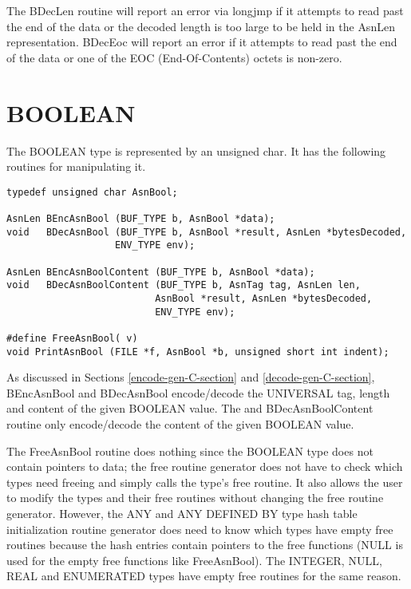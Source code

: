 The {\C BDecLen} routine will report an error via {\C longjmp} if
it attempts to read past the end of the data or the decoded length is
too large to be held in the {\C AsnLen} representation.
{\C BDecEoc} will report an error if it attempts to read past the
end of the data or one of the EOC (End-Of-Contents) octets is
non-zero.

\section{\label{bool-C-section}BOOLEAN}

The BOOLEAN type is represented by an {\C unsigned char}.  It has
the following routines for manipulating it.
\begin{small}
\begin{verbatim}
typedef unsigned char AsnBool;

AsnLen BEncAsnBool (BUF_TYPE b, AsnBool *data);
void   BDecAsnBool (BUF_TYPE b, AsnBool *result, AsnLen *bytesDecoded,
                   ENV_TYPE env);

AsnLen BEncAsnBoolContent (BUF_TYPE b, AsnBool *data);
void   BDecAsnBoolContent (BUF_TYPE b, AsnTag tag, AsnLen len,
                          AsnBool *result, AsnLen *bytesDecoded,
                          ENV_TYPE env);

#define FreeAsnBool( v)
void PrintAsnBool (FILE *f, AsnBool *b, unsigned short int indent);
\end{verbatim}
\end{small}

As discussed in Sections \ref{encode-gen-C-section} and \ref{decode-gen-C-section},
{\C BEncAsnBool} and {\C BDecAsnBool} encode/decode the UNIVERSAL
tag, length and content of the given BOOLEAN value.  The and {\C BDecAsnBoolContent} routine only
encode/decode the content of the given BOOLEAN value.

The {\C FreeAsnBool} routine does nothing since the BOOLEAN type
does not contain pointers to data; the free routine generator does not
have to check which types need freeing and simply calls the type's
free routine.  It also allows the user to modify the types and their
free routines without changing the free routine generator.  However,
the ANY and ANY DEFINED BY type hash table initialization routine
generator does need to know which types have empty free routines
because the hash entries contain pointers to the free functions (NULL
is used for the empty free functions like {\C FreeAsnBool}).  The
INTEGER, NULL, REAL and ENUMERATED types have empty free routines for
the same reason.

